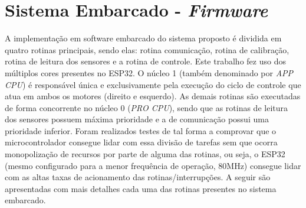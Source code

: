 \section{Sistema Embarcado - \emph{Firmware}}
\label{sec:sistema_embarcado}

A implementação em software embarcado do sistema proposto é dividida em quatro rotinas principais, sendo elas: rotina comunicação, rotina de calibração, rotina de leitura dos sensores  e a rotina de controle. 
Este trabalho fez uso dos múltiplos cores presentes no ESP32. 
O núcleo 1 (também denominado por \emph{APP CPU}) é responsável única e
exclusivamente  pela execução do ciclo de controle que atua em ambos os motores (direito e esquerdo). 
As demais rotinas são executadas de forma concorrente no núcleo 0 (\emph{PRO CPU}), sendo que as rotinas de leitura dos sensores possuem máxima prioridade e a de comunicação possui uma prioridade inferior. Foram realizados testes de tal forma a comprovar que o microcontrolador consegue lidar com essa 
divisão de tarefas sem que ocorra monopolização de recursos por parte de alguma das rotinas, ou seja, o ESP32 (mesmo configurado para a menor frequência de operação, 80MHz) consegue lidar com as altas taxas de acionamento das rotinas/interrupções. A seguir são apresentadas com mais detalhes cada uma das rotinas presentes no 
sistema embarcado.




